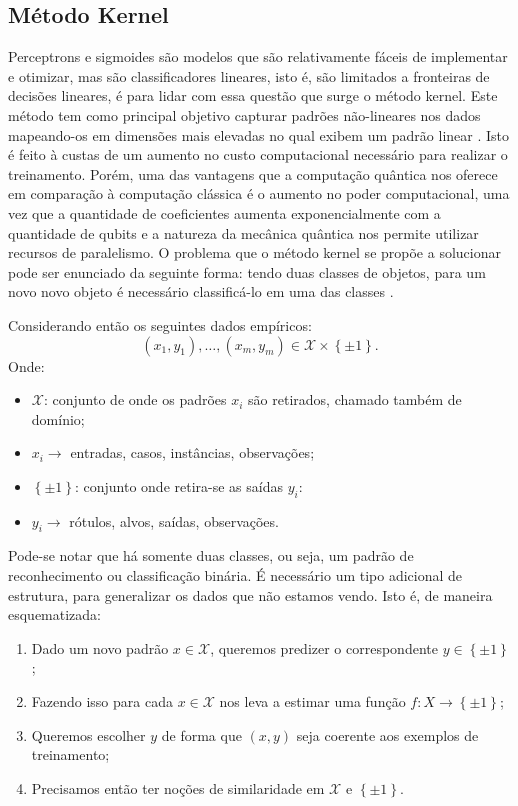 \subsection{Método Kernel}

Perceptrons e sigmoides são modelos que são relativamente fáceis de implementar e otimizar, mas são classificadores lineares, isto é, são limitados a fronteiras de decisões lineares, é para lidar com essa questão que surge o método kernel. Este método tem como principal objetivo capturar padrões não-lineares nos dados mapeando-os em dimensões mais elevadas no qual exibem um padrão linear \cite{kernel2}.  Isto é feito à custas de um aumento no custo computacional necessário para realizar o treinamento. Porém, uma das vantagens que a computação quântica nos oferece em comparação à computação clássica é o aumento no poder computacional, uma vez que a quantidade de coeficientes aumenta exponencialmente com a quantidade de qubits e a natureza da mecânica quântica nos permite utilizar recursos de paralelismo. O problema que o método kernel se propõe a solucionar pode ser enunciado da seguinte forma: tendo duas classes de objetos,  para um novo  novo objeto é necessário classificá-lo em uma das classes  \cite{kernel}.

Considerando então os seguintes dados empíricos:
\begin{equation}
\left(x_{1},y_{1}\right),\dots,\left(x_{m},y_{m}\right)\in\mathcal{X}\times\left\{ \pm1\right\}  .
\end{equation}Onde:
\begin{itemize}
\item  $ \mathcal{X} $: conjunto de onde os padrões $x_{i}$ são retirados, chamado também de domínio;
\item $ x_{i}\rightarrow $ entradas, casos, instâncias, observações;
\item  $\left\{ \pm1\right\}$: conjunto onde retira-se as saídas $y_{i}$:
\item $y_{i}\rightarrow $ rótulos, alvos, saídas, observações.
\end{itemize}
 
Pode-se notar que há somente duas classes, ou seja, um padrão de reconhecimento ou classificação binária. É necessário um tipo adicional de estrutura, para generalizar os dados que não estamos vendo. Isto é, de maneira esquematizada:

\begin{enumerate}
\item Dado um novo padrão $ x\in\mathcal{X}$, queremos predizer o correspondente $y\in\left\{ \pm1\right\}$ ;
\item Fazendo isso para cada $x\in\mathcal{X}$ nos leva a estimar uma função $f : X\rightarrow\left\{ \pm1\right\}$;
\item Queremos escolher $y$ de forma que $\left(x,y\right)$ seja coerente aos exemplos de treinamento;
\item Precisamos então ter noções de similaridade em $\mathcal{X}$ e $\left\{ \pm1\right\}$.
\end{enumerate}

